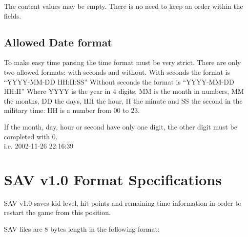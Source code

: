 \documentclass{article}
\begin{document}
 The content values may be empty. There is no need to keep an order within
 the fields.

\subsection{Allowed Date format}
 To make easy time parsing the time format must be very strict.
 There are only two allowed formats: with seconds and without.
 With seconds the format is ``YYYY-MM-DD HH:II:SS''
 Without seconds the format is ``YYYY-MM-DD HH:II''
 Where YYYY is the year in 4 digits, MM is the month in numbers, MM the
 months, DD the days, HH the hour, II the minute and SS the second in the
 military time: HH is a number from 00 to 23.

 If the month, day, hour or second have only one digit, the other digit
 must be completed with 0.\\
 i.e. 2002-11-26 22:16:39

\pagebreak[3]
\section{SAV v1.0 Format Specifications}

 SAV v1.0 saves kid level, hit points and remaining time information in
 order to restart the game from this position.

 SAV files are 8 bytes length in the following format:

\end{document}
